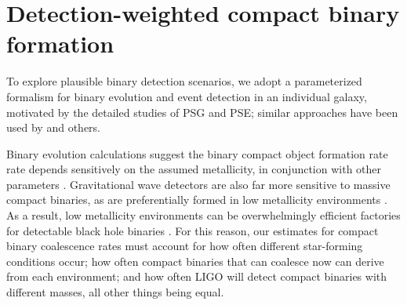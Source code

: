 \documentclass[nofootinbib,twocolumn,prd]{emulateapj}
\newcommand\abbrvPSgrb{PSG}
\newcommand\abbrvPSellipticals{PSE}
\begin{document}
\section{Detection-weighted compact binary formation}
\label{sec:model}


To explore plausible binary detection scenarios, we adopt a parameterized formalism for binary evolution and event
detection in an individual galaxy, motivated by
the detailed studies of  \abbrvPSgrb{} and \abbrvPSellipticals; similar approaches have been used by
\cite{2016arXiv160508783L} and others.


Binary evolution calculations suggest the binary compact object formation rate rate depends sensitively on the assumed metallicity, in conjunction
with other parameters \citep[see,\,e.g.][and references
  therein]{popsyn-LowMetallicityImpact-Chris2008,popsyn-LIGO-SFR-2008,gwastro-EventPopsynPaper-2016}.
Gravitational wave detectors are also far more sensitive to  massive compact binaries, as are  preferentially  formed in low metallicity
environments \citep{PSellipticals,popsyn-LowMetallicityImpact2c-StarTrackRevised-2014}.  As a result, low metallicity
environments can be overwhelmingly efficient factories for detectable black hole binaries
\citep{popsyn-LowMetallicityImpact2c-StarTrackRevised-2014,gwastro-EventPopsynPaper-2016}.  
%
For this reason, our estimates for compact binary coalescence rates must account for how often  different star-forming
conditions occur;  how often compact binaries that can coalesce now can  derive from each environment; and how often LIGO will detect compact
binaries with different masses, all other things being equal.
\end{document}
